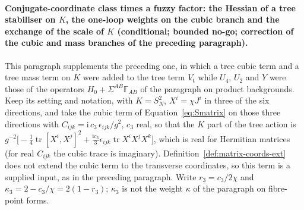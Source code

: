 \paragraph{Conjugate-coordinate class times a fuzzy factor: the Hessian of a tree stabiliser on \(K\), the one-loop weights on the cubic branch and the exchange of the scale of \(K\) (conditional; bounded no-go; correction of the cubic and mass branches of the preceding paragraph).}
This paragraph supplements the preceding one, in which a tree cubic term and a tree mass term on \(K\) were added to the tree term \(V_{\mathrm t}\) while \(U_4\), \(U_2\) and \(Y\) were those of the operators \(H_0+\Sigma^{AB}\mathbb F_{AB}\) of the paragraph on product backgrounds. Keep its setting and notation, with \(K=S^2_N\), \(X^i=\chi J^i\) in three of the six directions, and take the cubic term of Equation~\eqref{eq:Smatrix} on those three directions with \(C_{ijk}=\mathrm i\,c_3\,\epsilon_{ijk}/g^2\), \(c_3\) real, so that the \(K\) part of the tree action is \(g^{-2}\bigl[-\tfrac14\operatorname{tr}[X^i,X^j]^2+\tfrac{\mathrm ic_3}{3}\epsilon_{ijk}\operatorname{tr}X^iX^jX^k\bigr]\), which is real for Hermitian matrices (for real \(C_{ijk}\) the cubic trace is imaginary). Definition~\ref{def:matrix-coords-ext} does not extend the cubic term to the transverse coordinates, so this term is a supplied input, as in the preceding paragraph. Write \(r_3=c_3/2\chi\) and \(\kappa_3=2-c_3/\chi=2(1-r_3)\); \(\kappa_3\) is not the weight \(\kappa\) of the paragraph on fibre-point forms.


